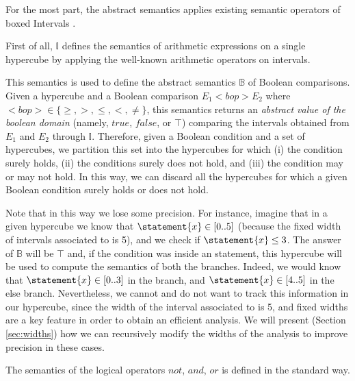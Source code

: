 For the most part, the abstract semantics applies existing semantic operators of boxed Intervals \cite{COU98}.

First of all, $\mathbb{I}$ defines the semantics of arithmetic expressions on a single hypercube by applying the well-known arithmetic operators on intervals.

This semantics is used to define the abstract semantics $\mathbb{B}$ of Boolean comparisons. Given a hypercube and a Boolean comparison $E_1 <bop> E_2$ where $<bop> \in \{\geq, >, \leq, <, \neq \}$, this semantics returns an \emph{abstract value of the boolean domain} (namely, $\mathit{true}$, $\mathit{false}$, or $\top$) comparing the intervals obtained from $E_1$ and $E_2$ through $\mathbb{I}$. Therefore, given a Boolean condition and a set of hypercubes, we partition this set into the hypercubes for which (i) the condition surely holds, (ii) the conditions surely does not hold, and (iii) the condition may or may not hold. In this way, we can discard all the hypercubes for which a given Boolean condition surely holds or does not hold.

Note that in this way we lose some precision. For instance, imagine that in a given hypercube we know that $\statement{x} \in [0..5]$ (because the fixed width of intervals associated to  is 5), and we check if $\statement{x} \leq 3$. The answer of $\mathbb{B}$ will be $\top$ and, if the condition was inside an  statement, this hypercube will be used to compute the semantics of both the branches. Indeed, we would know that $\statement{x} \in [0..3]$ in the  branch, and $\statement{x} \in [4..5]$ in the else branch. Nevertheless, we cannot and do not want to track this information in our hypercube, since the width of the interval associated to  is 5, and fixed widths are a key feature in order to obtain an efficient analysis. We will present (Section \ref{sec:widths}) how we can recursively modify the widths of the analysis to improve precision in these cases.

The semantics of the logical operators $not$, $and$, $or$ is defined in the standard way.

